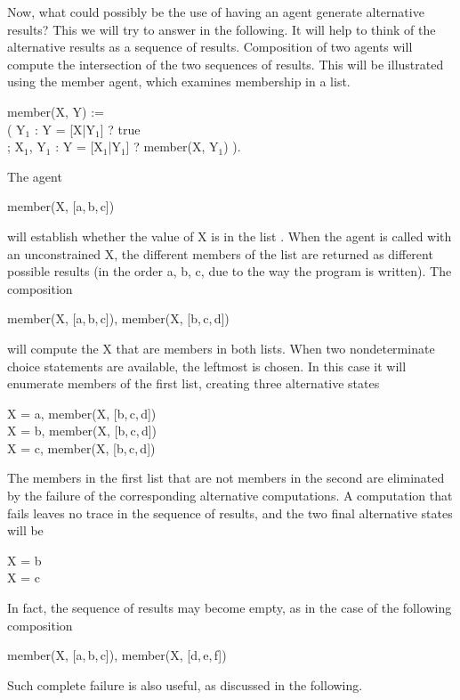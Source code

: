 Now, what could possibly be the use of having an agent generate
alternative results? This we will try to answer in the following.  It
will help to think of the alternative results as a sequence of
results.  Composition of two agents will compute the intersection of
the two sequences of results.  This will be illustrated using the
member agent, which examines membership in a list.
%
\begin{program}
member(X, Y) := \\
\>\>( Y$_1$ : Y = [X|Y$_1$] ? true \\
\>\>; X$_1$, Y$_1$ : Y = [X$_1$|Y$_1$] ? member(X, Y$_1$) ).
\end{program}%
%
The agent
%
\begin{progex}
member(X, [a,\,b,\,c])
\end{progex}%
%
will establish whether the value of {\prog X} is in the list {\prog
[a,\,b,\,c]}.  When the agent is called with an unconstrained {\prog
X}, the different members of the list are returned as different
possible results (in the order {\prog a, b, c}, due to the way the
program is written).  The composition
%
\begin{progex}
member(X, [a,\,b,\,c]), member(X, [b,\,c,\,d])
\end{progex}%
%
will compute the {\prog X} that are members in both lists.  When two
nondeterminate choice statements are available, the leftmost is
chosen.  In this case it will enumerate members of the first list,
creating three alternative states
%
\begin{progex}
X = a, member(X, [b,\,c,\,d]) \\
X = b, member(X, [b,\,c,\,d]) \\
X = c, member(X, [b,\,c,\,d])
\end{progex}%
%
The members in the first list that are not members in the second are
eliminated by the failure of the corresponding alternative
computations.  A computation that fails leaves no trace in the sequence
of results, and the two final alternative states will be
%
\begin{progex}
X = b \\
X = c 
\end{progex}%
%
In fact, the sequence of results may become empty, as in the case of
the following composition
%
\begin{progex}
member(X, [a,\,b,\,c]), member(X, [d,\,e,\,f])
\end{progex}%
%
Such complete failure is also useful, as discussed in the following.

